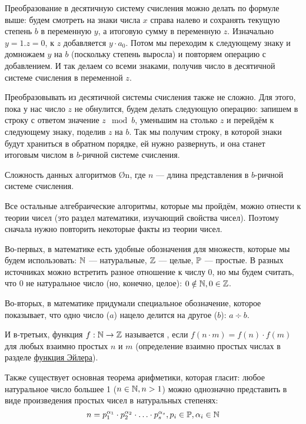 Преобразование в десятичную систему счисления можно делать по формуле выше: будем смотреть на знаки числа $x$ справа налево и сохранять текущую степень $b$ в переменную $y$, а итоговую сумму в переменную $z$. Изначально $y = 1. z = 0$, к $z$ добавляется $y \cdot a_0$. Потом мы переходим к следующему знаку и домножаем $y$ на $b$ (поскольку степень выросла) и повторяем операцию с добавлением. И так делаем со всеми знаками, получив число в десятичной системе счисления в переменной $z$.

Преобразовывать из десятичной системы счисления также не сложно. Для этого, пока у нас число $z$ не обнулится, будем делать следующую операцию: запишем в строку с ответом значение $z \mod b$, уменьшим на столько $z$ и перейдём к следующему знаку, поделив $z$ на $b$. Так мы получим строку, в которой знаки будут храниться в обратном порядке, ей нужно развернуть, и она станет итоговым числом в $b$-ричной системе счисления.

Сложность данных алгоритмов \O{n}, где $n$ — длина представления в $b$-ричной системе счисления.


Все остальные алгебраические алгоритмы, которые мы пройдём, можно отнести к теории чисел (это раздел математики, изучающий свойства чисел). Поэтому сначала нужно повторить некоторые факты из теории чисел.

Во-первых, в математике есть удобные обозначения для множеств, которые мы будем использовать: $\mathbb{N}$ — натуральные, $\mathbb{Z}$ — целые, $\mathbb{P}$ — простые. В разных источниках можно встретить разное отношение к числу 0, но мы будем считать, что 0 не натуральное число (но, конечно, целое): $0 \notin \mathbb{N}, 0 \in \mathbb{Z}$.

Во-вторых, в математике придумали специальное обозначение, которое показывает, что одно число ($a$) нацело делится на другое ($b$): $a \div b$.

И в-третьих, функция $f: \mathbb{N} \to \mathbb{Z}$ называется , если $f(n \cdot m) = f(n) \cdot f(m)$ для любых взаимно простых $n$ и $m$ (определение взаимно простых числах в разделе \hyperlink{euler_function}{функция Эйлера}).

Также существует основная теорема арифметики, которая гласит: любое натуральное число большее 1 ($n \in \mathbb{N}, n > 1$) можно однозначно представить в виде произведения простых чисел в натуральных степенях:
$$n = p_1^{\alpha_1} \cdot p_2^{\alpha_2} \cdot \ldots \cdot p_s^{\alpha_s}, p_i \in \mathbb{P}, \alpha_i \in \mathbb{N}$$

